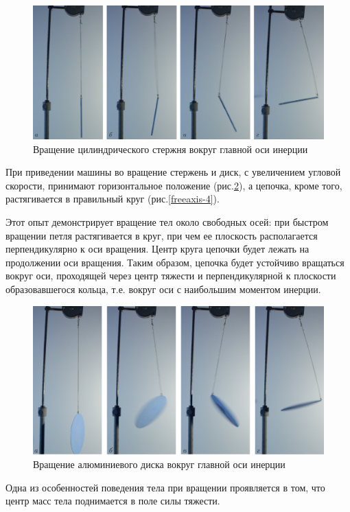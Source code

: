 \documentclass[14pt,a4paper,oneside]{extarticle}	%
\begin{document}
\begin{figure}[H] 
	\centering 		
	\includegraphics[width=0.9\linewidth]{freeaxis-2.png}
	\caption{Вращение цилиндрического стержня вокруг главной оси инерции}
	\label{freeaxis-2}
\end{figure}

При приведении машины во вращение стержень и диск, с увеличением угловой скорости, принимают горизонтальное положение (рис.\ref{freeaxis-3}), а цепочка, кроме того, растягивается в правильный круг (рис.\ref{freeaxis-4}).

Этот опыт демонстрирует вращение тел около свободных осей: при быстром вращении петля растягивается в круг, при чем ее плоскость располагается перпендикулярно к оси вращения. Центр круга цепочки будет лежать на продолжении оси вращения. Таким образом, цепочка будет устойчиво вращаться вокруг оси, проходящей через центр тяжести и перпендикулярной к плоскости образовавшегося кольца, т.е. вокруг оси с наибольшим моментом инерции.

\begin{figure}[H] 	
	\centering 		
	\includegraphics[width=0.9\linewidth]{freeaxis-3.png}
	\caption{Вращение алюминиевого диска вокруг главной оси инерции}
	\label{freeaxis-3}
\end{figure}

Одна из особенностей поведения тела при вращении проявляется в том, что центр масс тела поднимается в поле силы тяжести.
\end{document}
